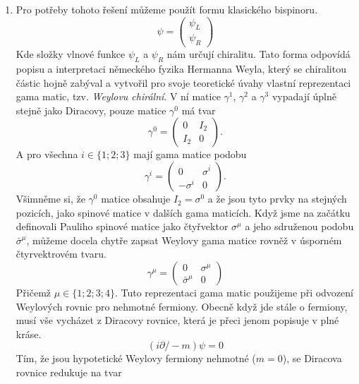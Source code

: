 \documentclass{../../../../style/mkimain}
\begin{document}
\noindent{}
\proborigin{}
\klein

\begin{enumerate}
    \item Pro potřeby tohoto řešení můžeme použít formu klasického bispinoru.
    \begin{equation} \label{eq:1}
    \psi=\begin{pmatrix}
        \psi_L\\
        \psi_R
    \end{pmatrix}
    \end{equation}
    Kde složky vlnové funkce $\psi_L$ a $\psi_R$ nám určují chiralitu. Tato forma odpovídá popisu a interpretaci německého fyzika Hermanna Weyla, který se chiralitou částic hojně zabýval a vytvořil pro svoje teoretické úvahy vlastní reprezentaci gama matic, tzv. \emph{Weylovu chirální}. V ní matice $\gamma^1$, $\gamma^2$ a $\gamma^3$ vypadají úplně stejně jako Diracovy, pouze matice $\gamma^0$ má tvar
     $$\gamma^0=\begin{pmatrix}
        0 & I_2\\
        I_2 & 0
    \end{pmatrix} \text{.}$$
A pro všechna $i\in\{1;2;3\}$ mají gama matice podobu
     $$\gamma^i=\begin{pmatrix}
        0 & \sigma^i\\
        -\sigma^i & 0
    \end{pmatrix} \text{.}$$
Všimněme si, že $\gamma^0$ matice obsahuje $I_2=\sigma^0$ a že jsou tyto prvky na stejných pozicích, jako spinové matice v dalších gama maticích. Když jsme na začátku definovali Pauliho spinové matice jako čtyřvektor $\sigma^\mu$ a jeho sdruženou podobu $\bar{\sigma}^\mu$, můžeme docela chytře zapsat Weylovy gama matice rovněž v úsporném čtyrvektrovém tvaru.
\begin{equation} \label{eq:2}
 \gamma^\mu=\begin{pmatrix}
        0 & \sigma^\mu\\
        \bar{\sigma}^\mu & 0
    \end{pmatrix}
\end{equation}
Přičemž $\mu\in\{1;2;3;4\}$.
Tuto reprezentaci gama matic použijeme při odvození Weylových rovnic pro nehmotné fermiony. Obecně když jde stále o fermiony, musí vše vycházet z Diracovy rovnice, která je přeci jenom popisuje v plné kráse.
 $$\left(i\partial\!\!\!/-m\right)\psi=0$$
Tím, že jsou hypotetické Weylovy fermiony nehmotné ($m=0$), se Diracova rovnice redukuje na tvar

\end{enumerate}
\end{document}

